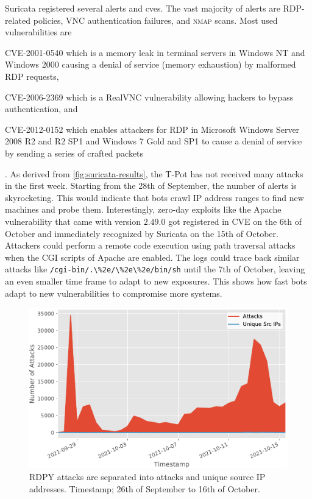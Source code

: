 Suricata registered several alerts and \acsp{cve}.
The vast majority of alerts are RDP-related policies, VNC authentication failures, and \textsc{nmap} scans.
Most used vulnerabilities are
\begin{enumerate*}[label=(\roman*)]
    \item CVE-2001-0540\cite{CVE-2001-0540} which is a memory leak in terminal servers in Windows NT and Windows 2000 causing a denial of service (memory exhaustion) by malformed RDP requests,
    \item CVE-2006-2369\cite{CVE-2006-2369} which is a RealVNC vulnerability allowing hackers to bypass authentication, and
    \item CVE-2012-0152\cite{CVE-2012-0152} which enables attackers for RDP in Microsoft Windows Server 2008 R2 and R2 SP1 and Windows 7 Gold and SP1 to cause a denial of service by sending a series of crafted packets
\end{enumerate*}.
As derived from \autoref{fig:suricata-results}, the T-Pot has not received many attacks in the first week.
Starting from the 28th of September, the number of alerts is skyrocketing.
This would indicate that bots crawl IP address ranges to find new machines and probe them.
Interestingly, zero-day exploits like the Apache vulnerability \cite{CVE-2021-42013} that came with version $2.49.0$ got registered in CVE on the 6th of October and immediately recognized by Suricata on the 15th of October.
Attackers could perform a remote code execution using path traversal attacks when the CGI scripts of Apache are enabled.
The logs could trace back similar attacks like \verb|/cgi-bin/.\%2e/\%2e\%2e/bin/sh| until the 7th of October, leaving an even smaller time frame to adapt to new exposures.
This shows how fast bots adapt to new vulnerabilities to compromise more systems.

\begin{figure}
    \centering
    \includegraphics[width=\textwidth]{figures/tpot-rdpy-port.pdf}
    \caption[RDPY results of T-Pot]{
        RDPY attacks are separated into attacks and unique source IP addresses.
        Timestamp; 26th of September to 16th of October.
    }
    \label{fig:rdpy-results}
\end{figure}

